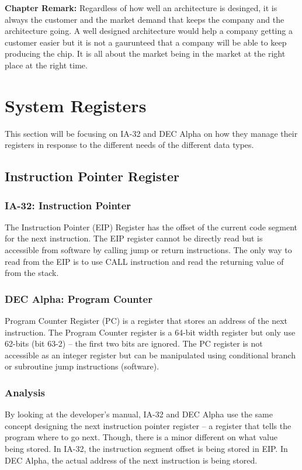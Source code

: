 \documentclass[letterpaper,10pt,titlepage]{article}
\begin{document}
\textbf{Chapter Remark:}
Regardless of how well an architecture is desinged, it is always the customer
and the market demand that keeps the company and the architecture going. 
A well designed architecture would help a company getting a customer
easier but it is not a gaurunteed that a company will be able to keep 
producing the chip. It is all about the market being in the market  at the 
right place at the right time.


\section{System Registers}
This section will be focusing on IA-32 and DEC Alpha on how they manage
their registers in response to the different needs of the different data types.
\subsection{Instruction Pointer Register}

\subsubsection{IA-32: Instruction Pointer}
The Instruction Pointer (EIP) Register has the offset of the current code segment
for the next instruction. The EIP register cannot be directly read but is 
accessible from software by calling jump or return instructions. The only way 
to read from the EIP is to use CALL instruction and read the returning value
of from the stack.

\subsubsection{DEC Alpha: Program Counter}
Program Counter Register (PC) is a register that stores an address of the next 
instruction. The Program Counter register is a 64-bit width register but only
use 62-bits (bit 63-2) -- the first two bits are ignored. The PC register is
not accessible as an integer register but can be manipulated using 
conditional branch or subroutine jump instructions (software).

\subsubsection{Analysis}
By looking at the developer's manual, IA-32 and DEC Alpha use the same concept  
designing the next instruction pointer register -- a register that tells the
program where to go next. Though, there is a minor different on 
what value being stored. In IA-32, the instruction segment offset is
being stored in EIP. In DEC Alpha, the actual address of the next instruction
is being stored. 
\end{document}
